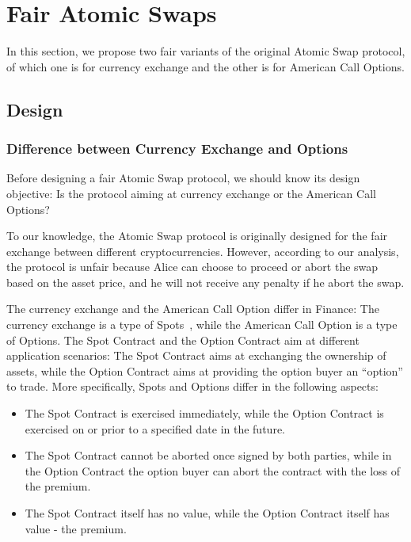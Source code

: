 \section{Fair Atomic Swaps}
\label{sec:fair_atomic_swap}

In this section, we propose two fair variants of the original Atomic Swap protocol, of which one is for currency exchange and the other is for American Call Options.



\subsection{Design}

\subsubsection{Difference between Currency Exchange and Options}
\label{subsubsec:diff_spot_option}

Before designing a fair Atomic Swap protocol, we should know its design objective:
Is the protocol aiming at currency exchange or the American Call Options?

To our knowledge, the Atomic Swap protocol is originally designed for the fair exchange between different cryptocurrencies.
However, according to our analysis, the protocol is unfair because Alice can choose to proceed or abort the swap based on the asset price, and he will not receive any penalty if he abort the swap.

The currency exchange and the American Call Option differ in Finance: The currency exchange is a type of Spots~\cite{hull1991introduction}, while the American Call Option is a type of Options.
The Spot Contract and the Option Contract aim at different application scenarios: The Spot Contract aims at exchanging the ownership of assets, while the Option Contract aims at providing the option buyer an ``option'' to trade.
More specifically, Spots and Options differ in the following aspects:

\begin{itemize}
    \item The Spot Contract is exercised immediately, while the Option Contract is exercised on or prior to a specified date in the future.
    \item The Spot Contract cannot be aborted once signed by both parties, while in the Option Contract the option buyer can abort the contract with the loss of the premium.
    \item The Spot Contract itself has no value, while the Option Contract itself has value - the premium.
\end{itemize}

